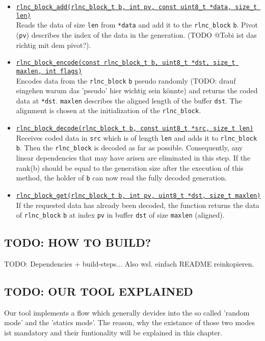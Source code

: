 \documentclass[a4paper,english,10pt]{tumarticle}
\begin{document}
\begin{itemize}
    \item \underline{\texttt{rlnc\_block\_add(rlnc\_block\_t b, int pv, const uint8\_t *data, size\_t len)}}\\
    Reads the data of size \texttt{len} from \texttt{*data} and add it to the \texttt{rlnc\_block} \texttt{b}. Pivot (\texttt{pv}) describes the index of the data in the generation. 
    (TODO @Tobi ist das richtig mit dem pivot?). 

    \item \underline{\texttt{rlnc\_block\_encode(const rlnc\_block\_t b, uint8\_t *dst, size\_t maxlen, int flags)}}\\
    Encodes data from the \texttt{rlnc\_block} \texttt{b} pseudo randomly (TODO: drauf eingehen warum das 'pseudo' hier wichtig sein könnte) and returns the coded data at \texttt{*dst}. 
    \texttt{maxlen} describes the aligned length of the buffer \texttt{dst}. The alignment is chosen at the initialization of the \texttt{rlnc\_block}.
    
    \item \underline{\texttt{rlnc\_block\_decode(rlnc\_block\_t b, const uint8\_t *src, size\_t len)}}\\
    Receives coded data in \texttt{src} which is of length \texttt{len} and adds it to \texttt{rlnc\_block} \texttt{b}. 
    Then the \texttt{rlnc\_block} is decoded as far as possible. 
    Consequently, any linear dependencies that may have arisen are eliminated in this step. If the rank(b) should 
    be equal to the generation size after the execution of this method, the holder of \texttt{b} can now read the fully decoded generation.

    \item \underline{\texttt{rlnc\_block\_get(rlnc\_block\_t b, int pv, uint8\_t *dst, size\_t maxlen)}}\\
    If the requested data has already been decoded, the function returns the data of \texttt{rlnc\_block} \texttt{b} at index \texttt{pv} in buffer 
    \texttt{dst} of size \texttt{maxlen} (aligned).
  \end{itemize}

\subsection{TODO: HOW TO BUILD?}\label{app:build}
TODO: Dependencies + build-steps... Also wsl. einfach README reinkopieren. 

\subsection{TODO: OUR TOOL EXPLAINED}\label{app:expl}
Our tool implements a flow which generally devides into the so called 'random mode' and the 'statics mode'.
The reason, why the existance of those two modes ist mandatory and their funtionality will be explained in this chapter.
\end{document}
